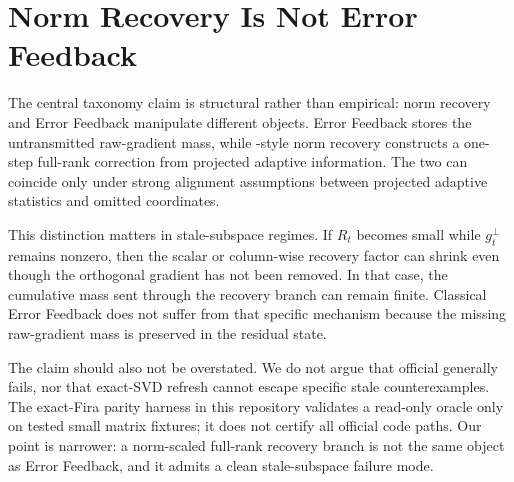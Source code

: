 \section{Norm Recovery Is Not Error Feedback}

The central taxonomy claim is structural rather than empirical: norm recovery
and Error Feedback manipulate different objects. Error Feedback stores the
untransmitted raw-gradient mass, while \Fira-style norm recovery constructs a
one-step full-rank correction from projected adaptive information. The two can
coincide only under strong alignment assumptions between projected adaptive
statistics and omitted coordinates.

This distinction matters in stale-subspace regimes. If $R_t$ becomes small
while $g_t^\perp$ remains nonzero, then the scalar or column-wise recovery
factor can shrink even though the orthogonal gradient has not been removed. In
that case, the cumulative mass sent through the recovery branch can remain
finite. Classical Error Feedback does not suffer from that specific mechanism
because the missing raw-gradient mass is preserved in the residual state.

The claim should also not be overstated. We do not argue that official
\Fira generally fails, nor that exact-SVD refresh cannot escape specific stale
counterexamples. The exact-Fira parity harness in this repository validates a
read-only oracle only on tested small matrix fixtures; it does not certify all
official code paths. Our point is narrower: a norm-scaled full-rank recovery
branch is not the same object as Error Feedback, and it admits a clean
stale-subspace failure mode.
